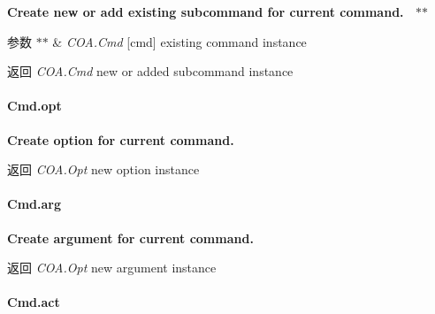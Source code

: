 {\bfseries  Create new or add existing subcommand for current command.~\newline
 $\ast$$\ast$
\begin{DoxyParams}{参数}
{\em $\ast$$\ast$} & {\itshape C\+O\+A.\+Cmd} {\ttfamily \mbox{[}cmd\mbox{]}} existing command instance~\newline
 {\bfseries }\\
\hline
\end{DoxyParams}
\begin{DoxyReturn}{返回}
{\bfseries } {\itshape C\+O\+A.\+Cmd} new or added subcommand instance
\end{DoxyReturn}
\paragraph*{Cmd.\+opt}}

{\bfseries  Create option for current command.~\newline
 {\bfseries \begin{DoxyReturn}{返回}
{\itshape C\+O\+A.\+Opt} {\ttfamily new} option instance
\end{DoxyReturn}
\paragraph*{Cmd.\+arg}}}

{\bfseries {\bfseries  Create argument for current command.~\newline
 {\bfseries \begin{DoxyReturn}{返回}
{\itshape C\+O\+A.\+Opt} {\ttfamily new} argument instance
\end{DoxyReturn}
\paragraph*{Cmd.\+act}}}}


